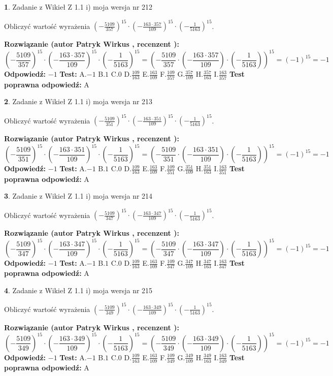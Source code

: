 \documentclass[12pt, a4paper]{article}
\theoremstyle{definition} %
\newtheorem{zad}{}
\newcommand{\zadStart}[1]{\begin{zad}#1\newline}
\newcommand{\zadStop}{\end{zad}}
\newcommand{\rozwStart}[2]{\noindent \textbf{Rozwiązanie (autor #1 , recenzent #2): }\newline}
\newcommand{\rozwStop}{\newline}
\newcommand{\odpStart}{\noindent \textbf{Odpowiedź:}\newline}
\newcommand{\odpStop}{\newline}
\newcommand{\testStart}{\noindent \textbf{Test:}\newline}
\newcommand{\testStop}{\newline}
\newcommand{\kluczStart}{\noindent \textbf{Test poprawna odpowiedź:}\newline}
\newcommand{\kluczStop}{\newline}
\begin{document}
\zadStart{Zadanie z Wikieł Z 1.1 i) moja wersja nr 212}

Obliczyć wartość wyrażenia $(-\frac{5109}{357})^{15} \cdot (-\frac{163 \cdot 357}{109})^{15} \cdot (-\frac{1}{5163})^{15}$.
\zadStop
\rozwStart{Patryk Wirkus}{}
$$(-\frac{5109}{357})^{15} \cdot (-\frac{163 \cdot 357}{109})^{15} \cdot (-\frac{1}{5163})^{15} = (-\frac{5109}{357} \cdot (-\frac{163 \cdot 357}{109}) \cdot (-\frac{1}{5163}))^{15} = (-1)^{15} = -1$$
\rozwStop
\odpStart
$-1$
\odpStop
\testStart
A.$-1$ B.$1$ C.$0$ D.$\frac{109}{163}$ E.$\frac{163}{109}$
F.$\frac{109}{357}$ G.$\frac{357}{109}$
H.$\frac{357}{163}$
I.$\frac{163}{357}$
\testStop
\kluczStart
A
\kluczStop



\zadStart{Zadanie z Wikieł Z 1.1 i) moja wersja nr 213}

Obliczyć wartość wyrażenia $(-\frac{5109}{351})^{15} \cdot (-\frac{163 \cdot 351}{109})^{15} \cdot (-\frac{1}{5163})^{15}$.
\zadStop
\rozwStart{Patryk Wirkus}{}
$$(-\frac{5109}{351})^{15} \cdot (-\frac{163 \cdot 351}{109})^{15} \cdot (-\frac{1}{5163})^{15} = (-\frac{5109}{351} \cdot (-\frac{163 \cdot 351}{109}) \cdot (-\frac{1}{5163}))^{15} = (-1)^{15} = -1$$
\rozwStop
\odpStart
$-1$
\odpStop
\testStart
A.$-1$ B.$1$ C.$0$ D.$\frac{109}{163}$ E.$\frac{163}{109}$
F.$\frac{109}{351}$ G.$\frac{351}{109}$
H.$\frac{351}{163}$
I.$\frac{163}{351}$
\testStop
\kluczStart
A
\kluczStop



\zadStart{Zadanie z Wikieł Z 1.1 i) moja wersja nr 214}

Obliczyć wartość wyrażenia $(-\frac{5109}{347})^{15} \cdot (-\frac{163 \cdot 347}{109})^{15} \cdot (-\frac{1}{5163})^{15}$.
\zadStop
\rozwStart{Patryk Wirkus}{}
$$(-\frac{5109}{347})^{15} \cdot (-\frac{163 \cdot 347}{109})^{15} \cdot (-\frac{1}{5163})^{15} = (-\frac{5109}{347} \cdot (-\frac{163 \cdot 347}{109}) \cdot (-\frac{1}{5163}))^{15} = (-1)^{15} = -1$$
\rozwStop
\odpStart
$-1$
\odpStop
\testStart
A.$-1$ B.$1$ C.$0$ D.$\frac{109}{163}$ E.$\frac{163}{109}$
F.$\frac{109}{347}$ G.$\frac{347}{109}$
H.$\frac{347}{163}$
I.$\frac{163}{347}$
\testStop
\kluczStart
A
\kluczStop



\zadStart{Zadanie z Wikieł Z 1.1 i) moja wersja nr 215}

Obliczyć wartość wyrażenia $(-\frac{5109}{349})^{15} \cdot (-\frac{163 \cdot 349}{109})^{15} \cdot (-\frac{1}{5163})^{15}$.
\zadStop
\rozwStart{Patryk Wirkus}{}
$$(-\frac{5109}{349})^{15} \cdot (-\frac{163 \cdot 349}{109})^{15} \cdot (-\frac{1}{5163})^{15} = (-\frac{5109}{349} \cdot (-\frac{163 \cdot 349}{109}) \cdot (-\frac{1}{5163}))^{15} = (-1)^{15} = -1$$
\rozwStop
\odpStart
$-1$
\odpStop
\testStart
A.$-1$ B.$1$ C.$0$ D.$\frac{109}{163}$ E.$\frac{163}{109}$
F.$\frac{109}{349}$ G.$\frac{349}{109}$
H.$\frac{349}{163}$
I.$\frac{163}{349}$
\testStop
\kluczStart
A
\kluczStop
\end{document}
